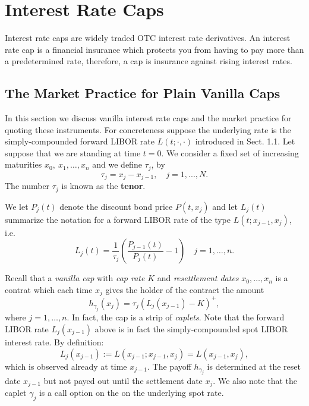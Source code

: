 \chapter{Interest Rate Caps}
Interest rate caps are widely traded OTC interest rate derivatives. An
interest rate cap is a financial insurance which protects you from
having to pay more than a predetermined rate,   
therefore, a cap is insurance against rising interest rates.
\section{The Market Practice for Plain Vanilla Caps}
In this section we discuss vanilla interest rate caps and the market
practice for quoting these instruments. For concreteness suppose the
underlying rate is the simply-compounded forward LIBOR rate
$L(t;\cdot,\cdot)$ introduced in Sect. 1.1. Let suppose that we are
standing at time $t=0$. We consider a fixed set of increasing
maturities $x_0,~x_1,\dots, x_n$ and we define $\tau_j$,
by $$\tau_j=x_j-x_{j-1},\quad j=1,...,N.$$ The number $\tau_j$ is
known as the {\bf tenor}. \begin{defn} We let $P_j(t)$ denote the
  discount bond price $P(t,x_j)$ and let $L_j(t)$ summarize the
  notation for a forward LIBOR rate of the type $L(t;x_{j-1},x_j)$,
  i.e.  
$$
L_j(t)=\frac{1}{\tau_j}\left(\frac{P_{j-1}(t)}{P_j(t)}-1\right)\quad
j=1,\dots,n. 
$$
\end{defn}
Recall that a \emph{vanilla cap} with \emph{cap rate} $K$ and
\emph{resettlement dates} $x_0,\dots,x_n$ is a contrat which each time
$x_j$ gives the holder of the contract the amount \begin{equation} 
\label{payoffCaplet}
h_{\gamma_j}(x_j) = \tau_j (L_j(x_{j-1})-K)^+,
\end{equation}
where $j=1,\dots,n$.
In fact, the cap is a strip of \emph{caplets}. Note that the forward
LIBOR rate $L_j(x_{j-1})$ above is in fact the
sim\-ply-\-com\-poun\-ded spot LIBOR interest rate. By definition: 
$$
L_j(x_{j-1}):=L(x_{j-1};x_{j-1},x_j)=L(x_{j-1},x_j),
$$
which is observed already at time $x_{j-1}$. The payoff
$h_{\gamma_j}$ is determined at the reset date $x_{j-1}$ but not payed
out until the settlement date $x_j$. We also note that the caplet
$\gamma_j$ is a call option on the on the underlying spot rate.

